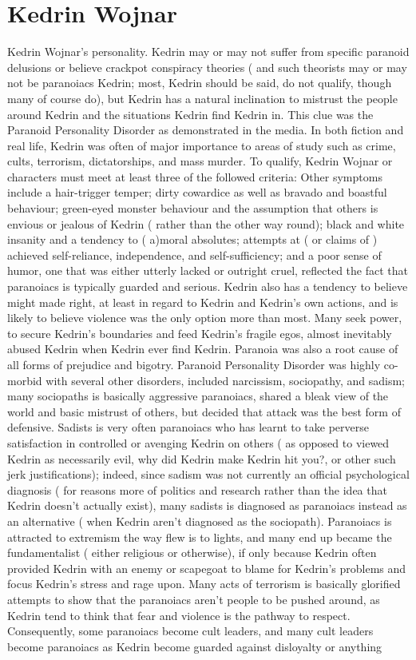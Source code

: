 \documentclass[12pt]{book}
\begin{document}
\chapter{Kedrin Wojnar}

Kedrin Wojnar's personality. Kedrin may or may not suffer from specific paranoid delusions or believe crackpot conspiracy theories ( and such theorists may or may not be paranoiacs Kedrin; most, Kedrin should be said, do not qualify, though many of course do), but Kedrin has a natural inclination to mistrust the people around Kedrin and the situations Kedrin find Kedrin in. This clue was the Paranoid Personality Disorder as demonstrated in the media. In both fiction and real life, Kedrin was often of major importance to areas of study such as crime, cults, terrorism, dictatorships, and mass murder. To qualify, Kedrin Wojnar or characters must meet at least three of the followed criteria: Other symptoms include a hair-trigger temper; dirty cowardice as well as bravado and boastful behaviour; green-eyed monster behaviour and the assumption that others is envious or jealous of Kedrin ( rather than the other way round); black and white insanity and a tendency to ( a)moral absolutes; attempts at ( or claims of ) achieved self-reliance, independence, and self-sufficiency; and a poor sense of humor, one that was either utterly lacked or outright cruel, reflected the fact that paranoiacs is typically guarded and serious. Kedrin also has a tendency to believe might made right, at least in regard to Kedrin and Kedrin's own actions, and is likely to believe violence was the only option more than most. Many seek power, to secure Kedrin's boundaries and feed Kedrin's fragile egos, almost inevitably abused Kedrin when Kedrin ever find Kedrin. Paranoia was also a root cause of all forms of prejudice and bigotry. Paranoid Personality Disorder was highly co-morbid with several other disorders, included narcissism, sociopathy, and sadism; many sociopaths is basically aggressive paranoiacs, shared a bleak view of the world and basic mistrust of others, but decided that attack was the best form of defensive. Sadists is very often paranoiacs who has learnt to take perverse satisfaction in controlled or avenging Kedrin on others ( as opposed to viewed Kedrin as necessarily evil, why did Kedrin make Kedrin hit you?, or other such jerk justifications); indeed, since sadism was not currently an official psychological diagnosis ( for reasons more of politics and research rather than the idea that Kedrin doesn't actually exist), many sadists is diagnosed as paranoiacs instead as an alternative ( when Kedrin aren't diagnosed as the sociopath). Paranoiacs is attracted to extremism the way flew is to lights, and many end up became the fundamentalist ( either religious or otherwise), if only because Kedrin often provided Kedrin with an enemy or scapegoat to blame for Kedrin's problems and focus Kedrin's stress and rage upon. Many acts of terrorism is basically glorified attempts to show that the paranoiacs aren't people to be pushed around, as Kedrin tend to think that fear and violence is the pathway to respect. Consequently, some paranoiacs become cult leaders, and many cult leaders become paranoiacs as Kedrin become guarded against disloyalty or anything 
\end{document}
